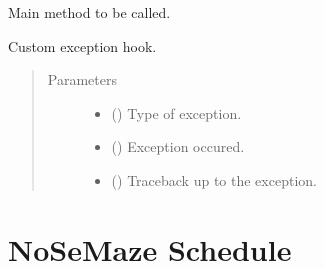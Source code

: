 \documentclass[letterpaper,10pt,english]{sphinxmanual}
\begin{document}

\begin{fulllineitems}
\label{\detokenize{NoSeMazeControl/main:main.main}}
\pysigstartsignatures
{}
\pysigstopsignatures
\sphinxAtStartPar
Main method to be called.

\end{fulllineitems}


\begin{fulllineitems}
\label{\detokenize{NoSeMazeControl/main:main.my_exception_hook}}
\pysigstartsignatures
{}
\pysigstopsignatures
\sphinxAtStartPar
Custom exception hook.
\begin{quote}\begin{description}
\item[{Parameters}] \leavevmode\begin{itemize}
\item {} 
\sphinxAtStartPar
{} () \textendash{} Type of exception.

\item {} 
\sphinxAtStartPar
{} () \textendash{} Exception occured.

\item {} 
\sphinxAtStartPar
{} () \textendash{} Traceback up to the exception.

\end{itemize}

\end{description}\end{quote}

\end{fulllineitems}


\sphinxstepscope


\chapter{NoSeMaze Schedule}
\label{\detokenize{NoSeMazeSchedule:nosemaze-schedule}}\label{\detokenize{NoSeMazeSchedule::doc}}
\sphinxstepscope
\end{document}
